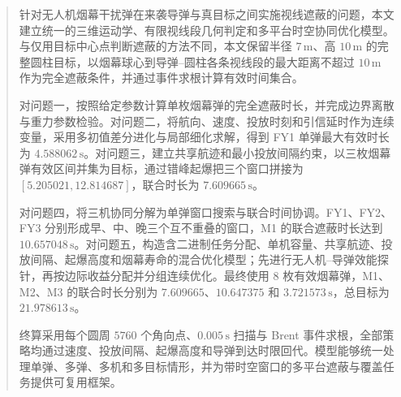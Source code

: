 \begin{abstract}
针对无人机烟幕干扰弹在来袭导弹与真目标之间实施视线遮蔽的问题，本文建立统一的三维运动学、有限视线段几何判定和多平台时空协同优化模型。与仅用目标中心点判断遮蔽的方法不同，本文保留半径 $7\,\mathrm{m}$、高 $10\,\mathrm{m}$ 的完整圆柱目标，以烟幕球心到导弹--圆柱各条视线段的最大距离不超过 $10\,\mathrm{m}$ 作为完全遮蔽条件，并通过事件求根计算有效时间集合。

对问题一，按照给定参数计算单枚烟幕弹的完全遮蔽时长，并完成边界离散与重力参数检验。对问题二，将航向、速度、投放时刻和引信延时作为连续变量，采用多初值差分进化与局部细化求解，得到 FY1 单弹最大有效时长为 $4.588062\,\mathrm{s}$。对问题三，建立共享航迹和最小投放间隔约束，以三枚烟幕弹有效区间并集为目标，通过错峰起爆把三个窗口拼接为 $[5.205021,12.814687]$，联合时长为 $7.609665\,\mathrm{s}$。

对问题四，将三机协同分解为单弹窗口搜索与联合时间协调。FY1、FY2、FY3 分别形成早、中、晚三个互不重叠的窗口，M1 的联合遮蔽时长达到 $10.657048\,\mathrm{s}$。对问题五，构造含二进制任务分配、单机容量、共享航迹、投放间隔、起爆高度和烟幕寿命的混合优化模型；先进行无人机--导弹效能探针，再按边际收益分配并分组连续优化。最终使用 $8$ 枚有效烟幕弹，M1、M2、M3 的联合时长分别为 $7.609665$、$10.647375$ 和 $3.721573\,\mathrm{s}$，总目标为 $21.978613\,\mathrm{s}$。

终算采用每个圆周 $5760$ 个角向点、$0.005\,\mathrm{s}$ 扫描与 Brent 事件求根，全部策略均通过速度、投放间隔、起爆高度和导弹到达时限回代。模型能够统一处理单弹、多弹、多机和多目标情形，并为带时空窗口的多平台遮蔽与覆盖任务提供可复用框架。

\end{abstract}
\endinput
\begin{abstract}
\keywords{烟幕干扰\quad 视线遮蔽\quad 弹道模型\quad 事件求根}
\end{abstract}
\endinput

\begin{abstract}
\textit{cumcmthesis} 是为\textbf{中国大学生数学建模竞赛}(\textbf{CUMCM, China Undergraduate Mathematical Contest in Modeling})编写的 \LaTeX{} 模板, 旨在让大家专注于论文的内容写作, 而不用花费过多精力在格式的定制和调整上.  使用者需要有一 定的 \LaTeX{} 的使用经验, 至少要会使用常用宏包的一些功能, 比如参考文献，数学公式，图片使用，列表环境等等.

\keywords{\TeX{}\quad \LaTeX{}\quad 图片\quad 表格\quad 公式}
\end{abstract}
